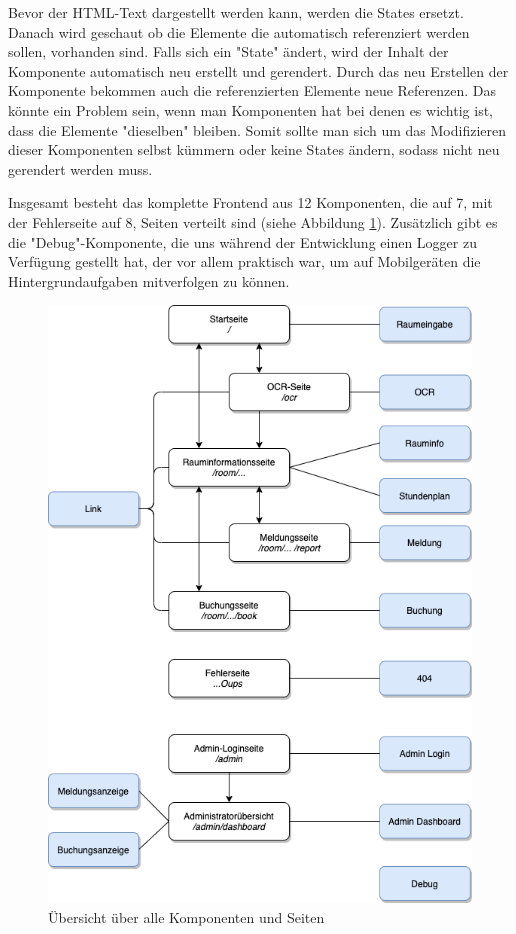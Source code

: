 Bevor der HTML-Text dargestellt werden kann, werden die States ersetzt. Danach wird geschaut ob die Elemente die automatisch referenziert werden sollen, vorhanden sind. Falls sich ein "State" ändert, wird der Inhalt der Komponente automatisch neu erstellt und gerendert. Durch das neu Erstellen der Komponente bekommen auch die referenzierten Elemente neue Referenzen. Das könnte ein Problem sein, wenn man Komponenten hat bei denen es wichtig ist, dass die Elemente "dieselben" bleiben. Somit sollte man sich um das Modifizieren dieser Komponenten selbst kümmern oder keine States ändern, sodass nicht neu gerendert werden muss.


Insgesamt besteht das komplette Frontend aus 12 Komponenten, die auf 7, mit der Fehlerseite auf 8, Seiten verteilt sind (siehe Abbildung \ref{fig:comppageoverview}). Zusätzlich gibt es die "Debug"-Komponente, die uns während der Entwicklung einen Logger zu Verfügung gestellt hat, der vor allem praktisch war, um auf Mobilgeräten die Hintergrundaufgaben mitverfolgen zu können.

\begin{figure}[H]
    \centering
    \includegraphics[width=150mm]{media/WebComponents/overview.png}
    \caption{Übersicht über alle Komponenten und Seiten}
    \label{fig:comppageoverview}
\end{figure}

